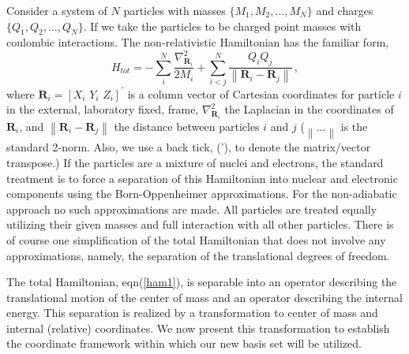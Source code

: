 \documentclass[12pt]{article}
\begin{document}
Consider a system of $N$ particles with masses $\{M_{1},M_{2},...,M_{N}\}$ and
charges $\{Q_{1},Q_{2},...,Q_{N}\}$. If we take the particles to be charged
point masses with coulombic interactions. The non-relativistic Hamiltonian has
the familiar form,
\begin{equation}
H_{tot}=-\sum_{i}^{N}\frac{\nabla_{\mathbf{R}_{i}}^{2}}{2M_{i}}+\sum_{i<j}%
^{N}\frac{Q_{i}Q_{j}}{\left\|  \mathbf{R}_{i}-\mathbf{R}_{j}\right\|
}\,,\label{ham1}%
\end{equation}
where $\mathbf{R}_{i}=[X_{i}\,\,Y_{i}\,\,Z_{i}]^{\prime}$ is a column vector
of Cartesian coordinates for particle $i$ in the external, laboratory fixed,
frame, $\nabla_{\mathbf{R}_{i}}^{2}$ the Laplacian in the coordinates of
$\mathbf{R}_{i}$, and $\left\|  \mathbf{R}_{i}-\mathbf{R}_{j}\right\|  $ the
distance between particles $i$ and $j$ ($\left\|  ...\right\|  $ is the
standard 2-norm. Also, we use a back tick, ('), to denote the matrix/vector
transpose.) If the particles are a mixture of nuclei and electrons, the
standard treatment is to force a separation of this Hamiltonian into nuclear
and electronic components using the Born-Oppenheimer approximations. For the
non-adiabatic approach no such approximations are made. All particles are
treated equally utilizing their given masses and full interaction with all
other particles. There is of course one simplification of the total
Hamiltonian that does not involve any approximations, namely, the separation
of the translational degrees of freedom.

The total Hamiltonian, eqn(\ref{ham1}), is separable into an operator
describing the translational motion of the center of mass and an operator
describing the internal energy. This separation is realized by a
transformation to center of mass and internal (relative) coordinates. We now
present this transformation to establish the coordinate framework within which
our new basis set will be utilized.
\end{document}
